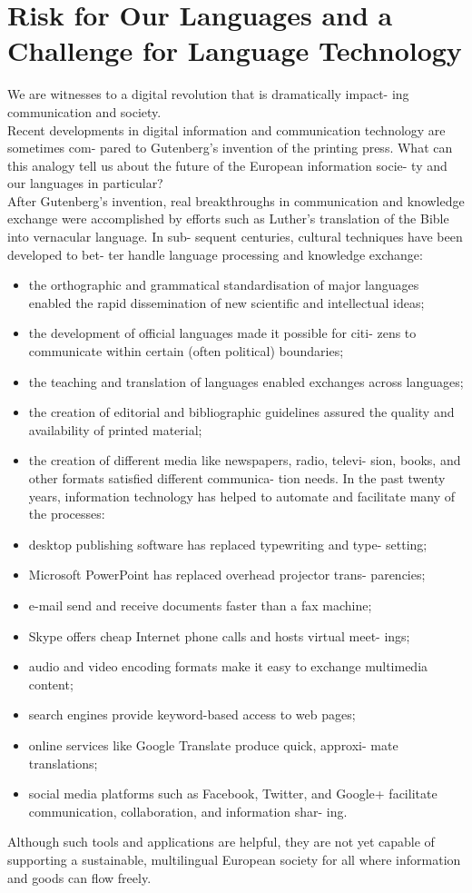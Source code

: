 \documentclass[]{../metanetpaper}
\begin{document}
	\section{Risk for Our Languages and a Challenge for Language Technology}
	We are witnesses to a digital revolution that is dramatically impact-
ing communication and society. 
\\Recent developments in digital
information and communication technology are sometimes com-
pared to Gutenberg’s invention of the printing press. What can this
analogy tell us about the future of the European information socie-
ty and our languages in particular?\\
After Gutenberg’s invention, real breakthroughs in communication
and knowledge exchange were accomplished by efforts such as
Luther’s translation of the Bible into vernacular language. In sub-
sequent centuries, cultural techniques have been developed to bet-
ter handle language processing and knowledge exchange:
\begin{itemize}
\item the orthographic and grammatical standardisation of major
   languages enabled the rapid dissemination of new scientific and
  intellectual ideas;
\item the development of official languages made it possible for citi-
   zens to communicate within certain (often political) boundaries;
\item the teaching and translation of languages enabled exchanges
   across languages;
\item the creation of editorial and bibliographic guidelines assured
   the quality and availability of printed material;
\item the creation of different media like newspapers, radio, televi-
   sion, books, and other formats satisfied different communica-
  tion needs.
In the past twenty years, information technology has helped to
automate and facilitate many of the processes:
\item desktop publishing software has replaced typewriting and type-
   setting;
\item Microsoft PowerPoint has replaced overhead projector trans-
   parencies;
\item e-mail send and receive documents faster than a fax machine;
\item Skype offers cheap Internet phone calls and hosts virtual meet-
   ings;
\item audio and video encoding formats make it easy to exchange
   multimedia content;
\item search engines provide keyword-based access to web pages;
\item online services like Google Translate produce quick, approxi-
   mate translations;
\item social media platforms such as Facebook, Twitter, and Google+
   facilitate communication, collaboration, and information shar-
  ing.
\end{itemize}
Although such tools and applications are helpful, they are not yet
capable of supporting a sustainable, multilingual European society
for all where information and goods can flow freely.
\end{document}
